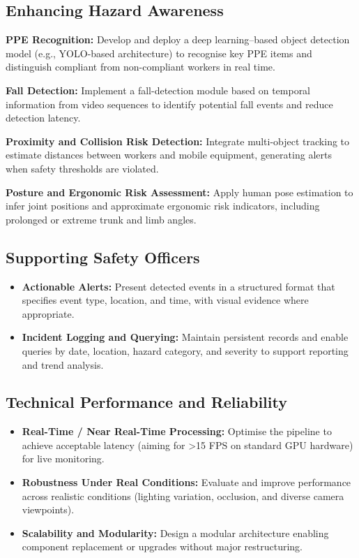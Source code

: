 \subsection{Enhancing Hazard Awareness}

\textbf{PPE Recognition:} Develop and deploy a deep learning–based object detection model (e.g., YOLO-based architecture) to recognise key PPE items and distinguish compliant from non-compliant workers in real time.

\textbf{Fall Detection:} Implement a fall-detection module based on temporal information from video sequences to identify potential fall events and reduce detection latency.

\textbf{Proximity and Collision Risk Detection:} Integrate multi-object tracking to estimate distances between workers and mobile equipment, generating alerts when safety thresholds are violated.

\textbf{Posture and Ergonomic Risk Assessment:} Apply human pose estimation to infer joint positions and approximate ergonomic risk indicators, including prolonged or extreme trunk and limb angles.

\subsection{Supporting Safety Officers}

\begin{itemize}
\item \textbf{Actionable Alerts:} Present detected events in a structured format that specifies event type, location, and time, with visual evidence where appropriate.
\item \textbf{Incident Logging and Querying:} Maintain persistent records and enable queries by date, location, hazard category, and severity to support reporting and trend analysis.
\end{itemize}

\subsection{Technical Performance and Reliability}

\begin{itemize}
\item \textbf{Real-Time / Near Real-Time Processing:} Optimise the pipeline to achieve acceptable latency (aiming for >15 FPS on standard GPU hardware) for live monitoring.
\item \textbf{Robustness Under Real Conditions:} Evaluate and improve performance across realistic conditions (lighting variation, occlusion, and diverse camera viewpoints).
\item \textbf{Scalability and Modularity:} Design a modular architecture enabling component replacement or upgrades without major restructuring.
\end{itemize}


